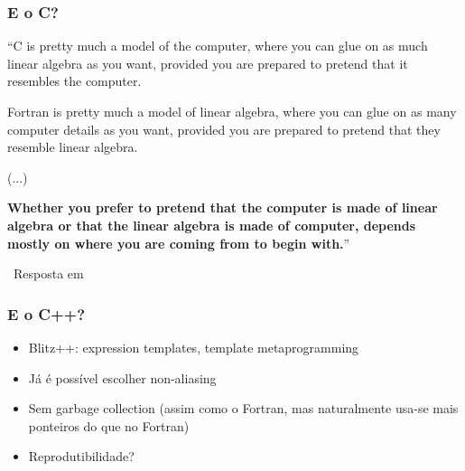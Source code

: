 \documentclass{beamer}
\begin{document}
\begin{darkframes}
  \begin{frame}
    \frametitle{E o C?}
    \begin{center}
      \begin{block}{}
        \small{``C is pretty much a model of the computer, where you can glue on as much linear algebra as you want, provided you are prepared to pretend that it resembles the computer.

        Fortran is pretty much a model of linear algebra, where you can glue on as many computer details as you want, provided you are prepared to pretend that they resemble linear algebra.

        (...)
        
        \textbf{Whether you prefer to pretend that the computer is made of linear algebra or that the linear algebra is made of computer, depends mostly on where you are coming from to begin with.}''}
      \end{block}
    \end{center}
    \begin{flushright}
      \vskip-0.7cm
      \hskip3cm \textemdash \ \footnotesize{Resposta em \cite{quora}}
    \end{flushright}
  \end{frame}

  \begin{frame}
    \frametitle{E o C++?}
    \begin{itemize}
    \item Blitz++: expression templates, template metaprogramming
    \item Já é possível escolher non-aliasing
    \item Sem garbage collection (assim como o Fortran, mas naturalmente usa-se mais ponteiros do que no Fortran)
    \item Reprodutibilidade?
    \end{itemize}
  \end{frame}
  

\end{darkframes}
\end{document}
